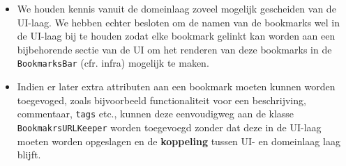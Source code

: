 \documentclass[12pt]{article}
\begin{document}
\begin{itemize}
	\item We houden kennis vanuit de domeinlaag zoveel mogelijk gescheiden van de UI-laag. We hebben echter besloten om de namen van de bookmarks wel in de UI-laag bij te houden zodat elke bookmark gelinkt kan worden aan een bijbehorende sectie van de UI om het renderen van deze bookmarks in de \texttt{BookmarksBar} (cfr. infra) mogelijk te maken.
	\item Indien er later extra attributen aan een bookmark moeten kunnen worden toegevoged, zoals bijvoorbeeld functionaliteit voor een beschrijving, commentaar, \texttt{tags} etc., kunnen deze eenvoudigweg aan de klasse \texttt{BookmakrsURLKeeper} worden toegevoegd zonder dat deze in de UI-laag moeten worden opgeslagen en de \textbf{koppeling} tussen UI- en domeinlaag laag blijft.
\end{itemize}
\end{document}

